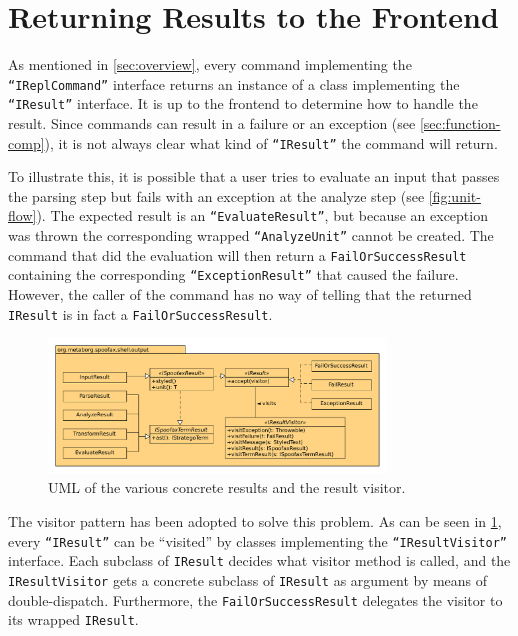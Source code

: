 \section{Returning Results to the Frontend}
\label{sec:visitor}

As mentioned in \cref{sec:overview}, every command implementing the
\texttt{``IReplCommand''} interface returns an instance of a class implementing
the \texttt{``IResult''} interface. It is up to the frontend to determine how to
handle the result. Since commands can result in a failure or an exception (see
\cref{sec:function-comp}), it is not always clear what kind of
\texttt{``IResult''} the command will return.

To illustrate this, it is possible that a user tries to evaluate an input that
passes the parsing step but fails with an exception at the analyze step (see
\cref{fig:unit-flow}). The expected result is an \texttt{``EvaluateResult''},
but because an exception was thrown the corresponding wrapped
\texttt{``AnalyzeUnit''} cannot be created. The command that did the evaluation
will then return a \texttt{FailOrSuccessResult} containing the corresponding
\texttt{``ExceptionResult''} that caused the failure. However, the caller of the
command has no way of telling that the returned \texttt{IResult} is in fact a
\texttt{FailOrSuccessResult}.

\begin{figure}[t]
  \centering
  \includegraphics[width=0.8\textwidth]{uml-visitor}
  \caption{UML of the various concrete results and the result visitor.}
  \label{fig:uml-visitor}
\end{figure}

The visitor pattern has been adopted to solve this problem. As can be seen in
\cref{fig:uml-visitor}, every \texttt{``IResult''} can be ``visited'' by classes
implementing the \texttt{``IResultVisitor''} interface. Each subclass of
\texttt{IResult} decides what visitor method is called, and the
\texttt{IResultVisitor} gets a concrete subclass of \texttt{IResult} as argument
by means of double-dispatch. Furthermore, the \texttt{FailOrSuccessResult}
delegates the visitor to its wrapped \texttt{IResult}.

